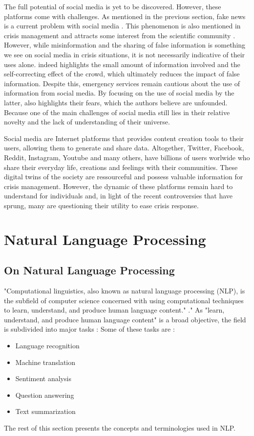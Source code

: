 The full potential of social media is yet to be discovered.
However, these platforms come with challenges.
As mentioned in the previous section, fake news is a current problem with social media \cite{lazerScienceFakeNews2018,vosoughiSpreadTrueFalse2018,oshikawaSurveyNaturalLanguage2018}.
This phenomenon is also mentioned in crisis management and attracts some interest from the scientific community \cite{starbirdExaminingAlternativeMedia2017,sellMisinformationUSEbola2020}.
However, while misinformation and the sharing of false information is something we see on social media in crisis situations, it is not necessarily indicative of their uses alone.
\cite{bubendorffConstructionDisseminationInformation2021} indeed highlights the small amount of information involved and the self-correcting effect of the crowd, which ultimately reduces the impact of false information.
Despite this, emergency services remain cautious about the use of information from social media.
By focusing on the use of social media by the latter, \cite{tapiaGoodEnoughGood2014} also highlights their fears, which the authors believe are unfounded.
Because one of the main challenges of social media still lies in their relative novelty and the lack of understanding of their universe.

Social media are Internet platforms that provides content creation tools to their users, allowing them to generate and share data.
Altogether, Twitter, Facebook, Reddit, Instagram, Youtube and many others, have billions of users worlwide who share their everyday life, creations and feelings with their communities.
These digital twins of the society are ressourceful and possess valuable information for crisis management.
However, the dynamic of these platforms remain hard to understand for individuals and, in light of the recent controversies that have sprung, many are questioning their utility to ease crisis response.

\section{Natural Language Processing}
\subsection{On Natural Language Processing}
"Computational linguistics, also known as natural language processing (NLP), is the subfield of computer science concerned with using computational techniques to learn, understand, and produce human language content." \cite{hirschbergAdvancesNaturalLanguage2015}."
As "learn, understand, and produce human language content" is a broad objective, the field is subdivided into major tasks :
Some of these tasks are :
\begin{itemize}
    \item Language recognition
    \item Machine translation
    \item Sentiment analysis
    \item Question answering
    \item Text summarization
\end{itemize}
The rest of this section presents the concepts and terminologies used in NLP.

